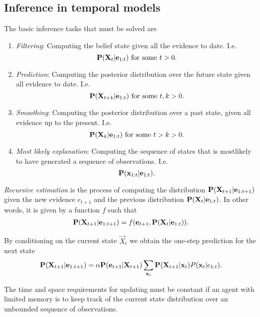 \documentclass{article}
\begin{document}
\subsection{Inference in temporal models}

The basic inference tasks that must be solved are
\begin{enumerate}
    \item \emph{Filtering}: Computing the belief state given all the evidence to date.
    I.e. \[\P(\vec X_t | \vec e_{1:t}) \text{ for some } t>0.\]
    \item \emph{Prediction}: Computing the posterior distribution over the future
    state given all evidence to date. I.e. \[\P(\vec X_{t+k}|\vec e_{1:t})\text{ for some }t,k>0.\]
    \item \emph{Smoothing}: Computing the posterior distribution over a past state, given all evidence
    up to the present. I.e. \[\P(\vec X_k | \vec e_{1:t}) \text{ for some } t>k>0.\] 
    \item \emph{Most likely explanation}: Computing the sequence of states that is mostlikely to have
    generated a sequence of observations. I.e. \[\P(\vec x_{1:t}|\vec e_{1:t}).\]
\end{enumerate}

\begin{definition}
    \emph{Recursive estimation} is the process of computing the distribution $\P(\vec X_{t+1}|\vec e_{1:t+1})$
    given the new evidence $e_{t+1}$ and the previous distribution $\P(\vec X_t|\vec e_{1:t})$. In other words,
    it is given by a function $f$ such that
    \begin{align*}
        \P(\vec X_{t+1}|\vec e_{1:t+1})=f(\vec e_{t+1}, \P(\vec X_t|\vec e_{1:t})).
    \end{align*}
\end{definition}

\begin{theorem}
    By conditioning on the current state $\vec X_t$ we obtain the one-step prediction for the
    next state
    \begin{align*}
        \P(\vec X_{t+1}|\vec e_{1:t+1}) = \alpha \P(\vec e_{t+1}|\vec X_{t+1})\sum_{\vec x_t} \P(\vec X_{t+1}|\vec x_t)P(\vec x_t|e_{1:t}).
    \end{align*}
\end{theorem}

\begin{theorem}
    The time and space requirements for updating must be constant if
    an agent with limited memory is to keep track of the current state
    distribution over an unbounded sequence of observations.
\end{theorem}
\end{document}
